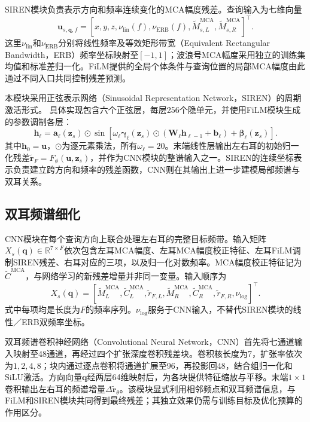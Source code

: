 \documentclass[UTF8,a4paper]{article}
\begin{document}
SIREN模块负责表示方向和频率连续变化的MCA幅度残差。查询输入为七维向量
\begin{equation}
\mathbf u_{s,\mathbf q,f}=
[x,y,z,\nu_{\mathrm{lin}}(f),\nu_{\mathrm{ERB}}(f),
 \widetilde M^{\mathrm{MCA}}_{s,L},\widetilde M^{\mathrm{MCA}}_{s,R}]^\top .
\end{equation}
这里$\nu_{\mathrm{lin}}$和$\nu_{\mathrm{ERB}}$分别将线性频率及等效矩形带宽（Equivalent Rectangular Bandwidth，ERB）频率坐标映射至$[-1,1]$；波浪号MCA幅度采用独立的训练集均值和标准差归一化。FiLM提供的全局个体条件与查询位置的局部MCA幅度由此通过不同入口共同控制残差预测。

本模块采用正弦表示网络（Sinusoidal Representation Network，SIREN）的周期激活形式\cite{R11}。
具体实现包含六个正弦层，每层256个隐单元，并使用FiLM模块生成的参数调制各层：
\begin{equation}
\mathbf h_\ell=\mathbf a_\ell(\mathbf z_s)\odot
\sin\!\left[
\omega_\ell\boldsymbol\gamma_\ell(\mathbf z_s)\odot
(\mathbf W_\ell\mathbf h_{\ell-1}+\mathbf b_\ell)
+\boldsymbol\beta_\ell(\mathbf z_s)\right].
\label{eq:film-siren}
\end{equation}
其中$\mathbf h_0=\mathbf u$，$\odot$为逐元素乘法，所有$\omega_\ell=20$。末端线性层输出左右耳的初始归一化残差$\widetilde{\mathbf r}_F=F_\phi(\mathbf u,\mathbf z_s)$，并作为CNN模块的整谱输入之一。SIREN的连续坐标表示负责建立跨方向和频率的残差函数，CNN则在其输出上进一步建模局部频谱与双耳关系。

\subsection{双耳频谱细化}
CNN模块在每个查询方向上联合处理左右耳的完整目标频带。输入矩阵$X_s(\mathbf q)\in\mathbb R^{7\times F}$依次包含左耳MCA幅度、左耳MCA幅度校正特征、左耳FiLM调制SIREN残差、右耳对应的三项，以及归一化对数频率。MCA幅度校正特征记为$\widetilde C^{\mathrm{MCA}}$，与网络学习的新残差增量并非同一变量。输入顺序为
\begin{equation}
X_s(\mathbf q)=
[\widetilde M_L^{\mathrm{MCA}},
 \widetilde C_L^{\mathrm{MCA}},\widetilde r_{F,L},
 \widetilde M_R^{\mathrm{MCA}},
 \widetilde C_R^{\mathrm{MCA}},\widetilde r_{F,R},
 \nu_{\log}]^\top .
\label{eq:cnn-input}
\end{equation}
式中每项均是长度为$F$的频率序列。$\nu_{\log}$服务于CNN输入，不替代SIREN模块的线性／ERB双频率坐标。

双耳频谱卷积神经网络（Convolutional Neural Network，CNN）首先将七通道输入映射至48通道，再经过四个扩张深度卷积残差块。卷积核长度为7，扩张率依次为$1,2,4,8$；块内通过逐点卷积将通道扩展至96，再投影回48，结合组归一化和SiLU激活。方向向量$\mathbf q$经两层64维映射后，为各块提供特征缩放与平移。末端$1\times1$卷积输出左右耳的频谱增量$\Delta\widetilde{\mathbf r}_\theta$。该模块显式利用相邻频点和双耳频谱信息，与FiLM和SIREN模块共同得到最终残差；其独立效果仍需与训练目标及优化预算的作用区分。
\end{document}
